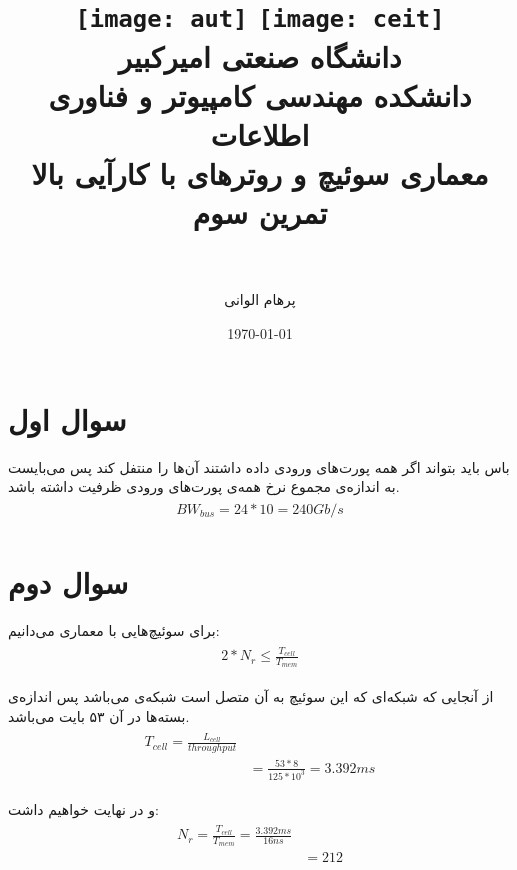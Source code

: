 \documentclass[paper=a4, fontsize=11pt]{article}
\title{
\normalfont\normalsize
\texttt{[image: aut]}
\hspace{5cm}
\texttt{[image: ceit]} \\
\textsc دانشگاه صنعتی امیرکبیر \\
\textsc دانشکده مهندسی کامپیوتر و فناوری اطلاعات
\horrule{0.5pt} \\ [0.4cm] %
\huge معماری سوئیچ و روترهای با کارآیی بالا \\ %
\huge تمرین سوم \\ %
\horrule{2pt} \\ [0.5cm] %
}
\author{پرهام الوانی}
\date{\normalsize\today} %
\numberwithin{equation}{section} %
\numberwithin{figure}{section} %
\numberwithin{table}{section} %
\begin{document}
\maketitle %

\section{سوال اول}
\par
باس باید بتواند اگر همه پورت‌های ورودی داده داشتند آن‌ها را منتفل کند پس می‌بایست به اندازه‌ی مجموع نرخ همه‌ی پورت‌های ورودی
ظرفیت داشته باشد.
\begin{align}\begin{split}
    BW_{bus} = 24 * 10 = 240 Gb/s
\end{split}\end{align}

\section{سوال دوم}
\par
برای سوئیچ‌هایی با معماری  می‌دانیم:
\begin{align}\begin{split}
    2 * N_r \le \frac{T_{cell}}{T_{mem}}
\end{split}\end{align}

از آنجایی که شبکه‌ای که این سوئیچ به آن متصل است شبکه‌ی 
می‌باشد پس اندازه‌ی بسته‌ها در آن ۵۳ بایت می‌باشد.
\begin{align}\begin{split}
    T_{cell} = \frac{L_{cell}}{throughput}\\
    & = \frac{53 * 8}{125 * 10^3} = 3.392 ms
\end{split}\end{align}

و در نهایت خواهیم داشت:
\begin{align}\begin{split}
    N_r = \frac{T_{cell}}{T_{mem}} = \frac{3.392ms}{16ns}\\
    & = 212
\end{split}\end{align}
\end{document}
